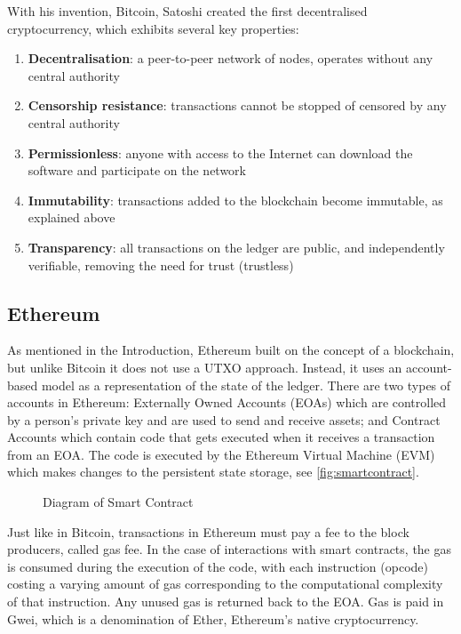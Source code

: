With his invention, Bitcoin, Satoshi created the first decentralised cryptocurrency, which exhibits several key properties:

\begin{enumerate}
    \item \textbf{Decentralisation}: a peer-to-peer network of nodes, operates without any central authority
    \item  \textbf{Censorship resistance}: transactions cannot be stopped of censored by any central authority
    \item  \textbf{Permissionless}: anyone with access to the Internet can download the software and participate on the network
    \item  \textbf{Immutability}: transactions added to the blockchain become immutable, as explained above
    \item  \textbf{Transparency}: all transactions on the ledger are public, and independently verifiable, removing the need for trust (trustless)
\end{enumerate}

\vspace{0.5cm}


\subsection{Ethereum}

As mentioned in the Introduction, Ethereum built on the concept of a blockchain, but unlike Bitcoin it does not use a UTXO approach. Instead, it uses an account-based model as a representation of the state of the ledger. There are two types of accounts in Ethereum: Externally Owned Accounts (EOAs) which are controlled by a person's private key and are used to send and receive assets; and Contract Accounts which contain code that gets executed when it receives a transaction from an EOA. The code is executed by the Ethereum Virtual Machine (EVM) which makes changes to the persistent state storage, see \autoref{fig:smartcontract}.

\begin{figure}[h]
    \centering
    \captionsetup{justification=centering}
    
    \caption[Diagram of Smart Contract]{Diagram of Smart Contract}
    \label{fig:smartcontract}
\end{figure}

Just like in Bitcoin, transactions in Ethereum must pay a fee to the block producers, called gas fee. In the case of interactions with smart contracts, the gas is consumed during the execution of the code, with each instruction (opcode) costing a varying amount of gas corresponding to the computational complexity of that instruction. Any unused gas is returned back to the EOA. Gas is paid in Gwei, which is a denomination of Ether, Ethereum's native cryptocurrency.

